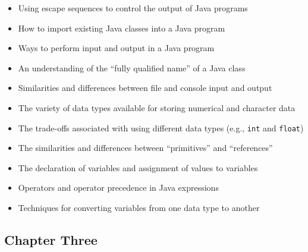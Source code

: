 \documentclass[11pt]{article}
\newcommand{\program}[1]{\lstinline{#1}}
\begin{document}
\begin{itemize}

  \itemsep 0in

  \item Using escape sequences to control the output of Java programs

  \item How to import existing Java classes into a Java program

  \item Ways to perform input and output in a Java program

  \item An understanding of the ``fully qualified name'' of a Java class

  \item Similarities and differences between file and console input and output

  \item The variety of data types available for storing numerical and character
    data

  \item The trade-offs associated with using different data types (e.g.,
    \program{int} and \program{float})

  \item The similarities and differences between ``primitives'' and
    ``references''

  \item The declaration of variables and assignment of values to variables

  \item Operators and operator precedence in Java expressions

  \item Techniques for converting variables from one data type to another

\end{itemize}

\subsection*{Chapter Three}
\end{document}
